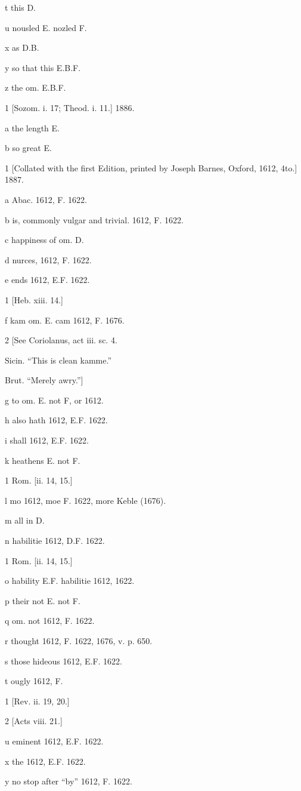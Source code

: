 t
this D.

u
nousled E. nozled F.

x
as D.B.

y
so that this E.B.F.

z
the om. E.B.F.

1
[Sozom. i. 17; Theod. i. 11.] 1886.

a
the length E.

b
so great E.

1
[Collated with the first Edition, printed by Joseph Barnes, Oxford, 1612, 4to.] 1887.

a
Abac. 1612, F. 1622.

b
is, commonly vulgar and trivial. 1612, F. 1622.

c
happiness of om. D.

d
nurces, 1612, F. 1622.

e
ends 1612, E.F. 1622.

1
[Heb. xiii. 14.]

f
kam om. E. cam 1612, F. 1676.

2
[See Coriolanus, act iii. sc. 4.

Sicin. “This is clean kamme.”

Brut. “Merely awry.”]

g
to om. E. not F, or 1612.

h
also hath 1612, E.F. 1622.

i
shall 1612, E.F. 1622.

k
heathens E. not F.

1
Rom. [ii. 14, 15.]

l
mo 1612, moe F. 1622, more Keble (1676).

m
all in D.

n
habilitie 1612, D.F. 1622.

1
Rom. [ii. 14, 15.]

o
hability E.F. habilitie 1612, 1622.

p
their not E. not F.

q
om. not 1612, F. 1622.

r
thought 1612, F. 1622, 1676, v. p. 650.

s
those hideous 1612, E.F. 1622.

t
ougly 1612, F.

1
[Rev. ii. 19, 20.]

2
[Acts viii. 21.]

u
eminent 1612, E.F. 1622.

x
the 1612, E.F. 1622.

y
no stop after “by” 1612, F. 1622.

